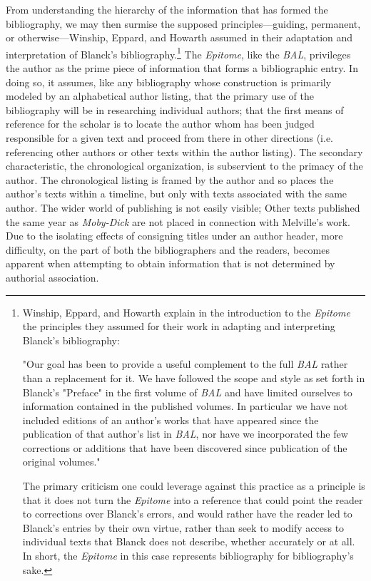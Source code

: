 From understanding the hierarchy of the information that has formed the bibliography, we may then surmise the supposed principles---guiding, permanent, or otherwise---Winship, Eppard, and Howarth assumed in their adaptation and interpretation of Blanck's bibliography.\footnote{Winship, Eppard, and Howarth explain in the introduction to the \textit{Epitome} the principles they assumed for their work in adapting and interpreting Blanck's bibliography: \begin{displayquote}"Our goal has been to provide a useful complement to the full \textit{BAL} rather than a replacement for it. We have followed the scope and style as set forth in Blanck's "Preface" in the first volume of \textit{BAL} and have limited ourselves to information contained in the published volumes. In particular we have not included editions of an author's works that have appeared since the publication of that author's list in \textit{BAL}, nor have we incorporated the few corrections or additions that have been discovered since publication of the original volumes."\autocite[vi]{winship_epitome_1995} \end{displayquote} 
The primary criticism one could leverage against this practice as a principle is that it does not turn the \textit{Epitome} into a reference that could point the reader to corrections over Blanck's errors, and would rather have the reader led to Blanck's entries by their own virtue, rather than seek to modify access to individual texts that Blanck does not describe, whether accurately or at all. In short, the \textit{Epitome} in this case represents bibliography for bibliography's sake.} The \textit{Epitome}, like the \textit{BAL}, privileges the author as the prime piece of information that forms a bibliographic entry. In doing so, it assumes, like any bibliography whose construction is primarily modeled by an alphabetical author listing, that the primary use of the bibliography will be in researching individual authors; that the first means of reference for the scholar is to locate the author whom has been judged responsible for a given text and proceed from there in other directions (i.e. referencing other authors or other texts within the author listing). The secondary characteristic, the chronological organization, is subservient to the primacy of the author. The chronological listing is framed by the author and so places the author's texts within a timeline, but only with texts associated with the same author. The wider world of publishing is not easily visible; Other texts published the same year as \textit{Moby-Dick} are not placed in connection with Melville's work. Due to the isolating effects of consigning titles under an author header, more difficulty, on the part of both the bibliographers and the readers, becomes apparent when attempting to obtain information that is not determined by authorial association. 

